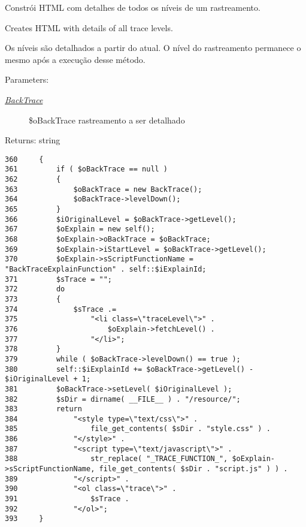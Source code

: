 Constrói HTML com detalhes de todos os níveis de um rastreamento.

Creates HTML with details of all trace levels.

Os níveis são detalhados a partir do atual. O nível do rastreamento permanece o mesmo após a execução desse método.

\begin{Desc}
\item[Parameters:]
\begin{description}
\item[{\em \hyperlink{class_back_trace}{BackTrace}}]\$oBackTrace rastreamento a ser detalhado \end{description}
\end{Desc}
\begin{Desc}
\item[Returns:]string \end{Desc}


\begin{Code}\begin{verbatim}360     {
361         if ( $oBackTrace == null )
362         {
363             $oBackTrace = new BackTrace();
364             $oBackTrace->levelDown();
365         }
366         $iOriginalLevel = $oBackTrace->getLevel();
367         $oExplain = new self();
368         $oExplain->oBackTrace = $oBackTrace;
369         $oExplain->iStartLevel = $oBackTrace->getLevel();
370         $oExplain->sScriptFunctionName = "BackTraceExplainFunction" . self::$iExplainId;
371         $sTrace = "";
372         do
373         {
374             $sTrace .=
375                 "<li class=\"traceLevel\">" .
376                     $oExplain->fetchLevel() .
377                 "</li>";
378         }
379         while ( $oBackTrace->levelDown() == true );
380         self::$iExplainId += $oBackTrace->getLevel() - $iOriginalLevel + 1;
381         $oBackTrace->setLevel( $iOriginalLevel );
382         $sDir = dirname( __FILE__ ) . "/resource/";
383         return
384             "<style type=\"text/css\">" .
385                 file_get_contents( $sDir . "style.css" ) .
386             "</style>" .
387             "<script type=\"text/javascript\">" .
388                 str_replace( "_TRACE_FUNCTION_", $oExplain->sScriptFunctionName, file_get_contents( $sDir . "script.js" ) ) .
389             "</script>" .
390             "<ol class=\"trace\">" .
391                 $sTrace .
392             "</ol>";
393     }
\end{verbatim}
\end{Code}




